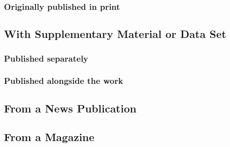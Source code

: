 \documentclass{article}
\begin{document}
\subsubsection{Originally published in print} %
\label{ssub:originally_published_in_print}
\begin{refsection}
	\nocite{Goldman:2010uv}
	\printbibliography[heading=none]
\end{refsection}
\subsection{With Supplementary Material or Data Set} %
\label{sub:with_supplementary_material_or_data_set}
\subsubsection{Published separately} %
\label{ssub:published_separately}
\begin{refsection}
	\nocite{ReplicationNonDemocratic:ws}
	\printbibliography[heading=none]
\end{refsection}
\subsubsection{Published alongside the work} %
\label{ssub:published_alongside_the_work}
\begin{refsection}
	\nocite{Moskowitz:aa}
	\printbibliography[heading=none]
\end{refsection}
\subsection{From a News Publication} %
\label{sub:from_a_news_publication}
\begin{refsection}
	\nocite{Parker-Pope:aa}
	\printbibliography[heading=none]
\end{refsection}
\subsection{From a Magazine} %
\label{sub:from_a_magazine}
\begin{refsection}
	\nocite{Chou:vq}
	\printbibliography[heading=none]
\end{refsection}
\end{document}

